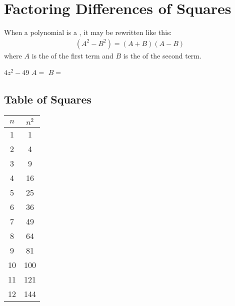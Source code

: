 \section{Factoring Differences of Squares}

\begin{tcolorbox}[center,width=5.75in]
    When a polynomial is a 
      ,
    it may be rewritten like this:
    {
    \Large
    \begin{align*}{}
        (A^2 - B^2) = (A+B)(A-B)
    \end{align*}
    }
    where $A$ is the   of the first term 
    and $B$ is the   of the second term.
\end{tcolorbox}

{
    \centering 
    $ 4z^2 - 49$
    \tcblower
    \hfill
    $A = $ \underline{\hspace{0.5in}}
    \hfill
    $B = $ \underline{\hspace{0.5in}}
    \hfill{}
}

\subsection{Table of Squares}

\begin{center}
    \large
    \begin{tabular}{cc}
        \toprule
        $n$ & $n^2$ \\
        \midrule
        1 & 1  \\
        2 & 4  \\
        3 & 9  \\
        4 & 16  \\
        5 & 25  \\
        6 & 36  \\
        7 & 49   \\
        8 & 64   \\
        9 & 81   \\
        10 & 100   \\
        11 & 121   \\
        12 & 144   \\
        \bottomrule
    \end{tabular}
\end{center}